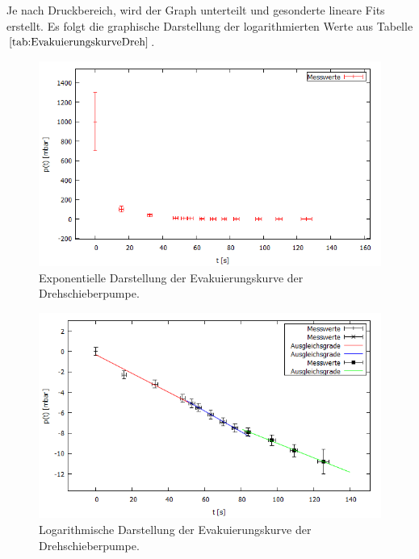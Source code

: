 Je nach Druckbereich, wird der Graph unterteilt und gesonderte lineare Fits erstellt.
Es folgt die graphische Darstellung der logarithmierten Werte aus Tabelle $\ref{tab:EvakuierungskurveDreh}$.

\begin{figure}[H]
  \centering
  \includegraphics[width=14cm]{bilder/drehexpo.png}
  \caption{Exponentielle Darstellung der Evakuierungskurve der Drehschieberpumpe.}
  \label{expoevakuierungdreh}
\end{figure}
\begin{figure}[H]
  \centering
  \includegraphics[width=14cm]{bilder/evakuierungDreh.png}
  \caption{Logarithmische Darstellung der Evakuierungskurve der Drehschieberpumpe.}
  \label{evakuierungdreh}
\end{figure}


